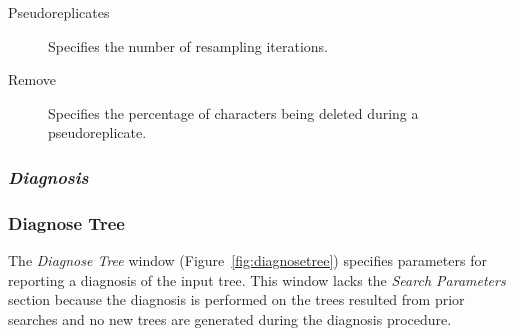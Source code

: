 \begin{description}
    \item[Pseudoreplicates] Specifies the number of resampling iterations.
    \item[Remove] Specifies the percentage of characters being deleted during a pseudoreplicate.
\end{description}

\subsubsection{\emph{Diagnosis}}

\subsubsection{Diagnose Tree}

The \emph{Diagnose Tree} window (Figure~\ref{fig:diagnosetree}) specifies parameters for reporting a diagnosis of the input tree. This window lacks the \emph{Search Parameters} section because the diagnosis is performed on the trees resulted from prior searches and no new trees are generated during the diagnosis procedure.

